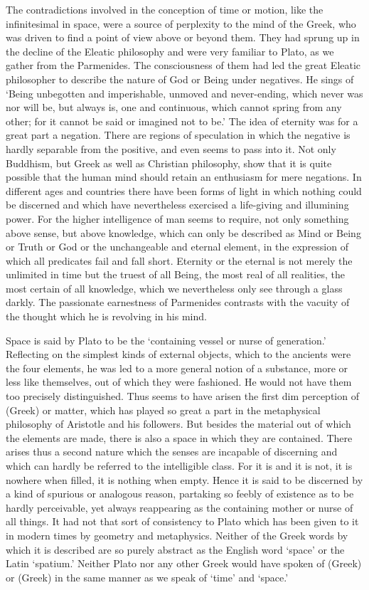The contradictions involved in the conception of time or motion, like the
infinitesimal in space, were a source of perplexity to the mind of the
Greek, who was driven to find a point of view above or beyond them. They
had sprung up in the decline of the Eleatic philosophy and were very
familiar to Plato, as we gather from the Parmenides. The consciousness of
them had led the great Eleatic philosopher to describe the nature of God
or Being under negatives. He sings of ‘Being unbegotten and imperishable,
unmoved and never-ending, which never was nor will be, but always is, one
and continuous, which cannot spring from any other; for it cannot be said
or imagined not to be.’ The idea of eternity was for a great part a
negation. There are regions of speculation in which the negative is hardly
separable from the positive, and even seems to pass into it. Not only
Buddhism, but Greek as well as Christian philosophy, show that it is quite
possible that the human mind should retain an enthusiasm for mere
negations. In different ages and countries there have been forms of light
in which nothing could be discerned and which have nevertheless exercised
a life-giving and illumining power. For the higher intelligence of man
seems to require, not only something above sense, but above knowledge,
which can only be described as Mind or Being or Truth or God or the
unchangeable and eternal element, in the expression of which all
predicates fail and fall short. Eternity or the eternal is not merely the
unlimited in time but the truest of all Being, the most real of all
realities, the most certain of all knowledge, which we nevertheless only
see through a glass darkly. The passionate earnestness of Parmenides
contrasts with the vacuity of the thought which he is revolving in his
mind.

Space is said by Plato to be the ‘containing vessel or nurse of
generation.’ Reflecting on the simplest kinds of external objects, which
to the ancients were the four elements, he was led to a more general
notion of a substance, more or less like themselves, out of which they
were fashioned. He would not have them too precisely distinguished. Thus
seems to have arisen the first dim perception of (Greek) or matter, which
has played so great a part in the metaphysical philosophy of Aristotle and
his followers. But besides the material out of which the elements are
made, there is also a space in which they are contained. There arises thus
a second nature which the senses are incapable of discerning and which can
hardly be referred to the intelligible class. For it is and it is not, it
is nowhere when filled, it is nothing when empty. Hence it is said to be
discerned by a kind of spurious or analogous reason, partaking so feebly
of existence as to be hardly perceivable, yet always reappearing as the
containing mother or nurse of all things. It had not that sort of
consistency to Plato which has been given to it in modern times by
geometry and metaphysics. Neither of the Greek words by which it is
described are so purely abstract as the English word ‘space’ or the Latin
‘spatium.’ Neither Plato nor any other Greek would have spoken of (Greek)
or (Greek) in the same manner as we speak of ‘time’ and ‘space.’

